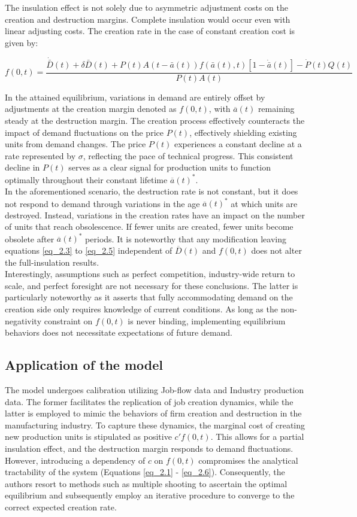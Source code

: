 \documentclass[12pt]{article}
\begin{document}
The insulation effect is not solely due to asymmetric adjustment costs on the creation and destruction margins. Complete
insulation would occur even with linear adjusting costs. The creation rate in the case of constant creation cost is
given by: 

\[\label{eq_2.10} f(0, t) = \frac{\dot{\bar{D}}(t) + \delta \bar{D}(t) + P(t) A(t - \bar{a}(t)) f(\bar{a}(t), t)[1 -
\dot{\bar{a}}(t)] - \dot{P}(t) Q(t)}{P(t) A(t)}\] 

In the attained equilibrium, variations in demand are entirely offset by adjustments at the creation margin denoted as
\(f(0, t)\), with \(\overline{a}(t)\) remaining steady at the destruction margin. The creation process effectively
counteracts the impact of demand fluctuations on the price \(P(t)\), effectively shielding existing units from demand
changes. The price \(P(t)\) experiences a constant decline at a rate represented by \(\sigma\), reflecting the pace of
technical progress. This consistent decline in \(P(t)\) serves as a clear signal for production units to function
optimally throughout their constant lifetime \(\overline{a}(t)^*\). \\
In the aforementioned scenario, the destruction rate is not constant, but it does not respond to demand through
variations in the age \(\overline{a}(t)^*\) at which units are destroyed. Instead, variations in the creation rates have
an impact on the number of units that reach obsolescence. If fewer units are created, fewer units become obsolete after
\(\overline{a}(t)^*\) periods. It is noteworthy that any modification leaving equations \ref{eq_2.3} to \ref{eq_2.5}
independent of \(\overline{D}(t)\) and \(f(0,t)\) does not alter the full-insulation results. 
\\
Interestingly, assumptions such as perfect competition, industry-wide return to scale, and perfect foresight are not
necessary for these conclusions. The latter is particularly noteworthy as it asserts that fully accommodating demand on
the creation side only requires knowledge of current conditions. As long as the non-negativity constraint on \(f(0,t)\)
is never binding, implementing equilibrium behaviors does not necessitate expectations of future demand. 
\subsection{Application of the model}
The model undergoes calibration utilizing Job-flow data and Industry production data. The former facilitates the
replication of job creation dynamics, while the latter is employed to mimic the behaviors of firm creation and
destruction in the manufacturing industry. To capture these dynamics, the marginal cost of creating new production units
is stipulated as positive \(c'f(0,t)\). This allows for a partial insulation effect, and the destruction margin responds
to demand fluctuations. However, introducing a dependency of \(c\) on \(f(0,t)\) compromises the analytical tractability
of the system (Equations \ref{eq_2.1} - \ref{eq_2.6}). Consequently, the authors resort to methods such as multiple
shooting to ascertain the optimal equilibrium and subsequently employ an iterative procedure to converge to the correct
expected creation rate. 
\end{document}
